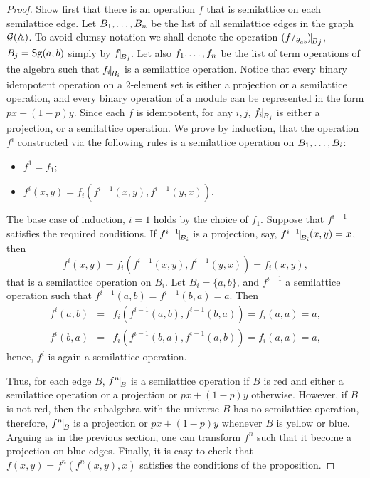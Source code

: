 \documentclass[11pt]{article}
\begin{document}
\begin{proof}
Show first that there is an operation $f$ that is semilattice on
each semilattice edge. Let $B _1,\ldots, B _{n}$ be the list of all semilattice edges in the graph 
${\mathcal G}({\mathbb A})$. To avoid clumsy notation we shall denote the operation
$(f\fac{\th_{ab}})\red B_j$, $B_j={\sf Sg}(a,b)$ simply by $f\red{B_j}$. Let also
$f _1,\ldots, f _{n}$ be the list of term operations of the algebra such that
$f_i\red{B_i}$ is a semilattice operation. Notice that every binary
idempotent operation on a 2-element set is either a projection or a
semilattice operation, and every binary operation of a module can be
represented in the form $px+(1-p)y$. Since each $f$ is idempotent,
for any $i,j$, $f_i\red{B_j}$ is either a projection, or a semilattice
operation. We prove by induction, that the operation $f^i$ constructed
via the following rules is a semilattice operation on $B _1,\ldots, B _{i}$:
\begin{itemize}
\item
$f^1=f_1$;
\item
$f^i(x,y)=f_i(f^{i-1}(x,y),f^{i-1}(y,x))$.
\end{itemize}

The base case of induction, $i=1$ holds by the choice of
$f_1$. Suppose that $f^{i-1}$ satisfies the required conditions. If
$f^{i-1}\red{B_i}$ is a projection, say, $f^{i-1}\red{B_i}(x,y)=x$,
then 
$$
f^i(x,y)=f_i(f^{i-1}(x,y),f^{i-1}(y,x))=f_i(x,y),
$$
that is a semilattice operation on $B_i$. Let $B_i=\{a,b\}$, and $f^{i-1}$ a
semilattice operation such that $f^{i-1}(a,b)=f^{i-1}(b,a)=a$. Then
\begin{eqnarray*}
f^i(a,b) &=& f_i(f^{i-1}(a,b),f^{i-1}(b,a))=f_i(a,a)=a,\\
f^i(b,a) &=& f_i(f^{i-1}(b,a),f^{i-1}(a,b))=f_i(a,a)=a,
\end{eqnarray*}
hence, $f^i$ is again a semilattice operation. 

Thus, for each edge $B$, $f^n\red B$ is a semilattice operation if $B$
is red and either a semilattice operation or a projection or $px+(1-p)y$
otherwise. However, if $B$ is not red, then the subalgebra with the
universe $B$ has no semilattice operation, therefore, $f^n\red B$ is
a projection or $px+(1-p)y$ whenever $B$ is yellow or blue. Arguing
as in the previous section, one can transform $f^n$ such that it
become a projection on blue edges. Finally, 
it is easy to check that $f(x,y)=f^n(f^n(x,y),x)$ satisfies the conditions of the
proposition.


\end{proof}
\end{document}
